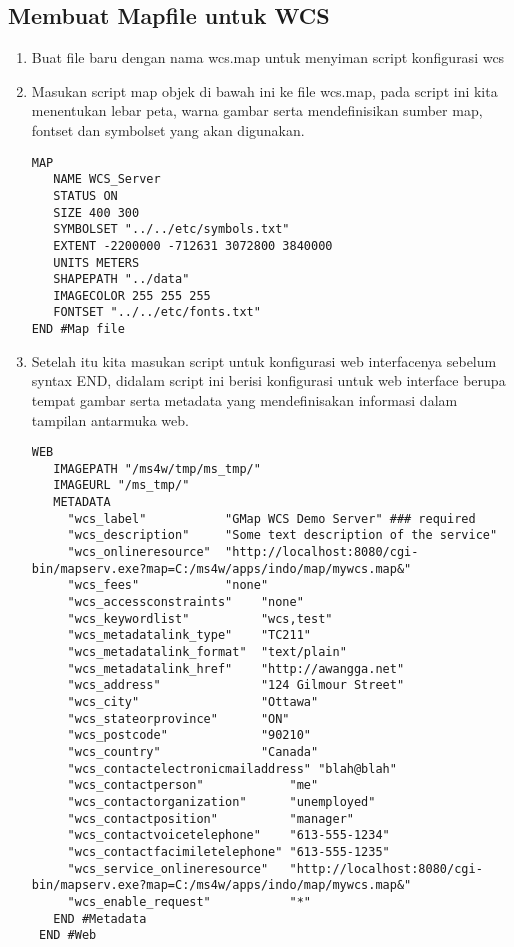 \subsection{Membuat Mapfile untuk WCS}
\begin{enumerate}
\item Buat file baru dengan nama wcs.map untuk menyiman script konfigurasi wcs
\item Masukan script map objek di bawah ini ke file wcs.map, pada script ini kita menentukan lebar peta, warna gambar serta mendefinisikan sumber map, fontset dan symbolset yang akan digunakan. 
\begin{lstlisting}
MAP
   NAME WCS_Server
   STATUS ON
   SIZE 400 300
   SYMBOLSET "../../etc/symbols.txt"
   EXTENT -2200000 -712631 3072800 3840000
   UNITS METERS
   SHAPEPATH "../data"
   IMAGECOLOR 255 255 255
   FONTSET "../../etc/fonts.txt"
END #Map file
\end{lstlisting}
\item Setelah itu kita masukan script untuk konfigurasi web interfacenya sebelum syntax END, didalam script ini berisi konfigurasi untuk web interface berupa tempat gambar serta metadata yang mendefinisakan informasi dalam tampilan antarmuka web.
\begin{lstlisting}
WEB
   IMAGEPATH "/ms4w/tmp/ms_tmp/"
   IMAGEURL "/ms_tmp/"
   METADATA
     "wcs_label"           "GMap WCS Demo Server" ### required
     "wcs_description"     "Some text description of the service"
     "wcs_onlineresource"  "http://localhost:8080/cgi-bin/mapserv.exe?map=C:/ms4w/apps/indo/map/mywcs.map&" 
     "wcs_fees"            "none"
     "wcs_accessconstraints"    "none"
     "wcs_keywordlist"          "wcs,test"
     "wcs_metadatalink_type"    "TC211"
     "wcs_metadatalink_format"  "text/plain"
     "wcs_metadatalink_href"    "http://awangga.net"
     "wcs_address"              "124 Gilmour Street"
     "wcs_city"                 "Ottawa"
     "wcs_stateorprovince"      "ON"
     "wcs_postcode"             "90210"
     "wcs_country"              "Canada"
     "wcs_contactelectronicmailaddress" "blah@blah"
     "wcs_contactperson"            "me"
     "wcs_contactorganization"      "unemployed"
     "wcs_contactposition"          "manager"
     "wcs_contactvoicetelephone"    "613-555-1234"
     "wcs_contactfacimiletelephone" "613-555-1235"
     "wcs_service_onlineresource"   "http://localhost:8080/cgi-bin/mapserv.exe?map=C:/ms4w/apps/indo/map/mywcs.map&"
     "wcs_enable_request"           "*"
   END #Metadata
 END #Web
\end{lstlisting}
\end{enumerate}



